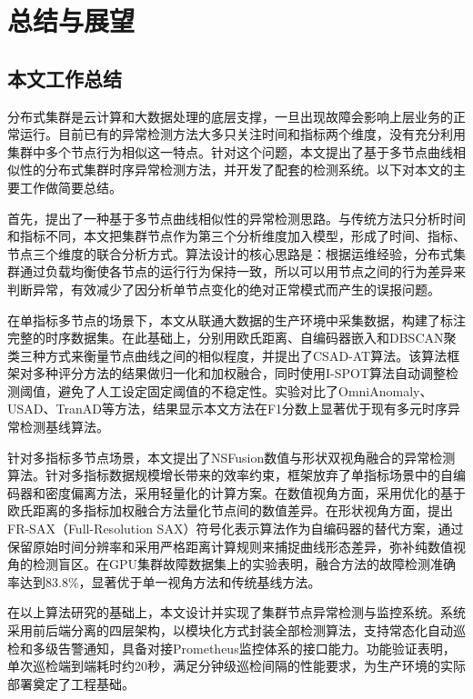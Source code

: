 \chapter{总结与展望}\label{chap:conclusion}

\section{本文工作总结}

分布式集群是云计算和大数据处理的底层支撑，一旦出现故障会影响上层业务的正常运行。目前已有的异常检测方法大多只关注时间和指标两个维度，没有充分利用集群中多个节点行为相似这一特点。针对这个问题，本文提出了基于多节点曲线相似性的分布式集群时序异常检测方法，并开发了配套的检测系统。以下对本文的主要工作做简要总结。

首先，提出了一种基于多节点曲线相似性的异常检测思路。与传统方法只分析时间和指标不同，本文把集群节点作为第三个分析维度加入模型，形成了时间、指标、节点三个维度的联合分析方式。算法设计的核心思路是：根据运维经验，分布式集群通过负载均衡使各节点的运行行为保持一致，所以可以用节点之间的行为差异来判断异常，有效减少了因分析单节点变化的绝对正常模式而产生的误报问题。

在单指标多节点的场景下，本文从联通大数据的生产环境中采集数据，构建了标注完整的时序数据集。在此基础上，分别用欧氏距离、自编码器嵌入和DBSCAN聚类三种方式来衡量节点曲线之间的相似程度，并提出了CSAD-AT算法。该算法框架对多种评分方法的结果做归一化和加权融合，同时使用I-SPOT算法自动调整检测阈值，避免了人工设定固定阈值的不稳定性。实验对比了OmniAnomaly、USAD、TranAD等方法，结果显示本文方法在F1分数上显著优于现有多元时序异常检测基线算法。

针对多指标多节点场景，本文提出了NSFusion数值与形状双视角融合的异常检测算法。针对多指标数据规模增长带来的效率约束，框架放弃了单指标场景中的自编码器和密度偏离方法，采用轻量化的计算方案。在数值视角方面，采用优化的基于欧氏距离的多指标加权融合方法量化节点间的数值差异。在形状视角方面，提出FR-SAX（Full-Resolution SAX）符号化表示算法作为自编码器的替代方案，通过保留原始时间分辨率和采用严格距离计算规则来捕捉曲线形态差异，弥补纯数值视角的检测盲区。在GPU集群故障数据集上的实验表明，融合方法的故障检测准确率达到83.8\%，显著优于单一视角方法和传统基线方法。

在以上算法研究的基础上，本文设计并实现了集群节点异常检测与监控系统。系统采用前后端分离的四层架构，以模块化方式封装全部检测算法，支持常态化自动巡检和多级告警通知，具备对接Prometheus监控体系的接口能力。功能验证表明，单次巡检端到端耗时约20秒，满足分钟级巡检间隔的性能要求，为生产环境的实际部署奠定了工程基础。

